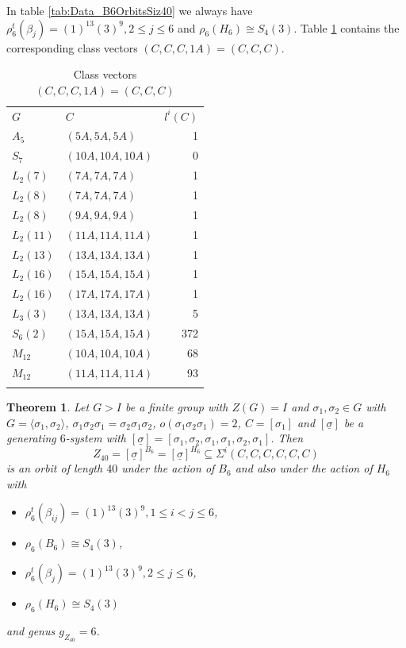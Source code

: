 \documentclass[12pt,a4paper]{article}
\newtheorem{theorem}{Theorem}[section]
\numberwithin{equation}{section}
\numberwithin{table}{section}
\begin{document}
In table \ref{tab:Data_B6OrbitsSiz40} we always have $\rho^t_6(\beta_j) = (1)^{13}(3)^9, 2 \leq j \leq 6$ 
and $\rho_6(H_6) \cong S_4(3)$.
Table \ref{tab:Data_B3OrbitsSiz1} contains the corresponding class vectors $(C,C,C,1A) = (C,C,C)$.
%
\begin{table}[H]
\centering
\footnotesize
\captionsetup{font=footnotesize}
\caption{Class vectors $(C,C,C,1A) = (C,C,C)$}
\label{tab:Data_B3OrbitsSiz1}
\begin{tabular}{llr}
\hline\noalign{\smallskip}
$G$       & $C$             & $l^i(C)$ \\
\noalign{\smallskip}\hline\noalign{\smallskip}
$A_5$     & $(5A,5A,5A)$    & 1 \\
$S_7$     & $(10A,10A,10A)$ & 0 \\
$L_2(7)$  & $(7A,7A,7A)$    & 1 \\
$L_2(8)$  & $(7A,7A,7A)$    & 1 \\
$L_2(8)$  & $(9A,9A,9A)$    & 1 \\
$L_2(11)$ & $(11A,11A,11A)$ & 1 \\
$L_2(13)$ & $(13A,13A,13A)$ & 1 \\
$L_2(16)$ & $(15A,15A,15A)$ & 1 \\
$L_2(16)$ & $(17A,17A,17A)$ & 1 \\
$L_3(3)$  & $(13A,13A,13A)$ & 5 \\
$S_6(2)$  & $(15A,15A,15A)$ & 372 \\
$M_{12}$  & $(10A,10A,10A)$ & 68 \\
$M_{12}$  & $(11A,11A,11A)$ & 93 \\
\noalign{\smallskip}\hline
\end{tabular}
\end{table}
%
\begin{theorem}
\label{BraidOrbitsOfSize40}
Let $G>I$ be a finite group with $Z(G)=I$ and $\sigma_1, \sigma_2 \in G$ with
$G=\langle \sigma_1, \sigma_2 \rangle$,
$\sigma_1 \sigma_2 \sigma_1 = \sigma_2 \sigma_1 \sigma_2$,
$o(\sigma_1 \sigma_2 \sigma_1 )=2$, $C = [\sigma_1]$ and
$[\underline{\sigma}]$ be a generating $6$-system with
$[\underline{\sigma}] = [\sigma_1, \sigma_2, \sigma_1, \sigma_1, \sigma_2, \sigma_1]$.
Then
$$Z_{40} = [\underline{\sigma}]^{B_6} = [\underline{\sigma}]^{H_6} \subseteq \Sigma^i(C,C,C,C,C,C)$$
is an orbit of length $40$ under the action of $B_6$ and also under the action of $H_6$ with
\begin{itemize}
\item[]
$\rho^t_6(\beta_{ij}) = (1)^{13}(3)^9, 1 \leq i < j \leq 6$,
\item[]
$\rho_6(B_6) \cong S_4(3)$,
\item[]
$\rho^t_6(\beta_j) = (1)^{13}(3)^9, 2 \leq j \leq 6$,
\item[]
$\rho_6(H_6) \cong S_4(3)$
\end{itemize}
and genus $g_{Z_{40}}=6$.
\end{theorem}
\end{document}
